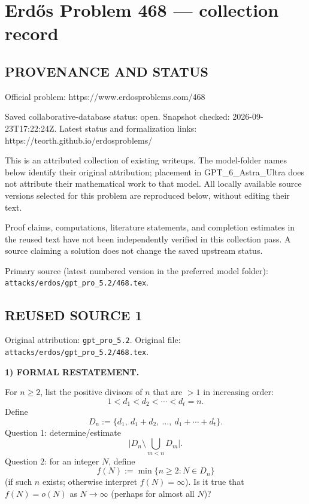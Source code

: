 \section*{Erd\H{o}s Problem 468 --- collection record}

\subsection*{PROVENANCE AND STATUS}
Official problem: https://www.erdosproblems.com/468

Saved collaborative-database status: open.
Snapshot checked: 2026-09-23T17:22:24Z.
Latest status and formalization links: https://teorth.github.io/erdosproblems/

This is an attributed collection of existing writeups. The model-folder names below identify their original attribution; placement in GPT\_6\_Astra\_Ultra does not attribute their mathematical work to that model. All locally available source versions selected for this problem are reproduced below, without editing their text.

Proof claims, computations, literature statements, and completion estimates in the reused text have not been independently verified in this collection pass. A source claiming a solution does not change the saved upstream status.

Primary source (latest numbered version in the preferred model folder): \texttt{attacks/erdos/gpt\_pro\_5.2/468.tex}.

\subsection*{REUSED SOURCE 1}
Original attribution: \texttt{gpt\_pro\_5.2}.
Original file: \texttt{attacks/erdos/gpt\_pro\_5.2/468.tex}.


\noindent\textbf{1) FORMAL RESTATEMENT.}

For $n\ge 2$, list the positive divisors of $n$ that are $>1$ in increasing order:
\[
1<d_1<d_2<\cdots<d_t=n.
\]
Define
\[
D_n:=\{d_1,\ d_1+d_2,\ \dots,\ d_1+\cdots+d_t\}.
\]
Question 1: determine/estimate
\[
\bigl|D_n\setminus \bigcup_{m<n} D_m\bigr|.
\]
Question 2: for an integer $N$, define
\[
f(N):=\min\{n\ge 2: N\in D_n\}
\]
(if such $n$ exists; otherwise interpret $f(N)=\infty$). Is it true that $f(N)=o(N)$ as $N\to\infty$ (perhaps for almost all $N$)?

